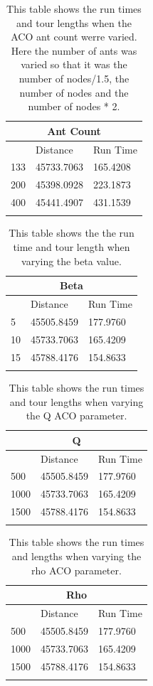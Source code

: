 \begin{longtable}[c]{|l|l|l|}
\hline
\multicolumn{3}{|c|}{Ant Count}  \\ \hline
\endfirsthead
%
\endhead
%
    & Distance    & Run Time   \\ \hline
133 & 45733.7063 & 165.4208  \\ \hline
200 & 45398.0928 & 223.1873 \\ \hline
400 & 45441.4907 & 431.1539 \\ \hline
\caption{This table shows the run times and tour lengths when the ACO ant count werre varied. Here the number of ants was varied so that it was the number of nodes/1.5, the number of nodes and the number of nodes * 2.}
\label{tab:ant_count_aco_table}\\
\end{longtable}

\begin{longtable}[c]{|l|l|l|}
\hline
\multicolumn{3}{|c|}{Beta}     \\ \hline
\endfirsthead
%
\endhead
%
   & Distance    & Run Time  \\ \hline
5  & 45505.8459 & 177.9760   \\ \hline
10 & 45733.7063 & 165.4209   \\ \hline
15 & 45788.4176 & 154.8633 \\ \hline
\caption{This table shows the the run time and tour length when varying the beta value.}
\label{tab:beta_aco_table}\\
\end{longtable}

\begin{longtable}[c]{|l|l|l|}
\hline
\multicolumn{3}{|c|}{Q}      \\ \hline
\endfirsthead
%
\endhead
%
     & Distance   & Run Time \\ \hline
500  & 45505.8459 & 177.9760 \\ \hline
1000 & 45733.7063 & 165.4209 \\ \hline
1500 & 45788.4176 & 154.8633 \\ \hline
\caption{This table shows the run times and tour lengths when varying the Q ACO parameter.}
\label{tab:q_aco_table}\\
\end{longtable}

\begin{longtable}[c]{|l|l|l|}
\hline
\multicolumn{3}{|c|}{Rho}    \\ \hline
\endfirsthead
%
\endhead
%
     & Distance   & Run Time \\ \hline
500  & 45505.8459 & 177.9760 \\ \hline
1000 & 45733.7063 & 165.4209 \\ \hline
1500 & 45788.4176 & 154.8633 \\ \hline
\caption{This table shows the run times and lengths when varying the rho ACO parameter.}
\label{tab:rho_aco_table}\\
\end{longtable}

